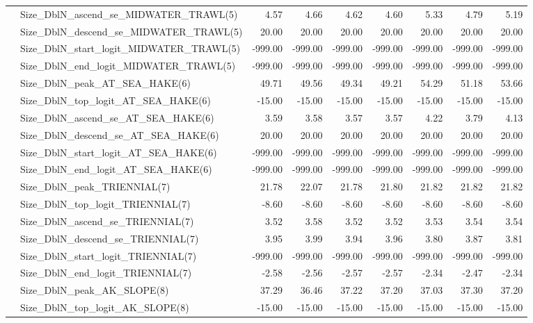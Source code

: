\documentclass[
]{scrartcl}
\begin{document}
\begin{landscape}
\begin{longtable}{llrrrrrrr}
 & Size\_DblN\_ascend\_se\_MIDWATER\_TRAWL(5) & 4.57 & 4.66 & 4.62 & 4.60 & 5.33 & 4.79 & 5.19 \\ 
 & Size\_DblN\_descend\_se\_MIDWATER\_TRAWL(5) & 20.00 & 20.00 & 20.00 & 20.00 & 20.00 & 20.00 & 20.00 \\ 
 & Size\_DblN\_start\_logit\_MIDWATER\_TRAWL(5) & -999.00 & -999.00 & -999.00 & -999.00 & -999.00 & -999.00 & -999.00 \\ 
 & Size\_DblN\_end\_logit\_MIDWATER\_TRAWL(5) & -999.00 & -999.00 & -999.00 & -999.00 & -999.00 & -999.00 & -999.00 \\ 
 & Size\_DblN\_peak\_AT\_SEA\_HAKE(6) & 49.71 & 49.56 & 49.34 & 49.21 & 54.29 & 51.18 & 53.66 \\ 
 & Size\_DblN\_top\_logit\_AT\_SEA\_HAKE(6) & -15.00 & -15.00 & -15.00 & -15.00 & -15.00 & -15.00 & -15.00 \\ 
 & Size\_DblN\_ascend\_se\_AT\_SEA\_HAKE(6) & 3.59 & 3.58 & 3.57 & 3.57 & 4.22 & 3.79 & 4.13 \\ 
 & Size\_DblN\_descend\_se\_AT\_SEA\_HAKE(6) & 20.00 & 20.00 & 20.00 & 20.00 & 20.00 & 20.00 & 20.00 \\ 
 & Size\_DblN\_start\_logit\_AT\_SEA\_HAKE(6) & -999.00 & -999.00 & -999.00 & -999.00 & -999.00 & -999.00 & -999.00 \\ 
 & Size\_DblN\_end\_logit\_AT\_SEA\_HAKE(6) & -999.00 & -999.00 & -999.00 & -999.00 & -999.00 & -999.00 & -999.00 \\ 
 & Size\_DblN\_peak\_TRIENNIAL(7) & 21.78 & 22.07 & 21.78 & 21.80 & 21.82 & 21.82 & 21.82 \\ 
 & Size\_DblN\_top\_logit\_TRIENNIAL(7) & -8.60 & -8.60 & -8.60 & -8.60 & -8.60 & -8.60 & -8.60 \\ 
 & Size\_DblN\_ascend\_se\_TRIENNIAL(7) & 3.52 & 3.58 & 3.52 & 3.52 & 3.53 & 3.54 & 3.54 \\ 
 & Size\_DblN\_descend\_se\_TRIENNIAL(7) & 3.95 & 3.99 & 3.94 & 3.96 & 3.80 & 3.87 & 3.81 \\ 
 & Size\_DblN\_start\_logit\_TRIENNIAL(7) & -999.00 & -999.00 & -999.00 & -999.00 & -999.00 & -999.00 & -999.00 \\ 
 & Size\_DblN\_end\_logit\_TRIENNIAL(7) & -2.58 & -2.56 & -2.57 & -2.57 & -2.34 & -2.47 & -2.34 \\ 
 & Size\_DblN\_peak\_AK\_SLOPE(8) & 37.29 & 36.46 & 37.22 & 37.20 & 37.03 & 37.30 & 37.20 \\ 
 & Size\_DblN\_top\_logit\_AK\_SLOPE(8) & -15.00 & -15.00 & -15.00 & -15.00 & -15.00 & -15.00 & -15.00 \\ 

\end{longtable}
\end{landscape}
\end{document}
